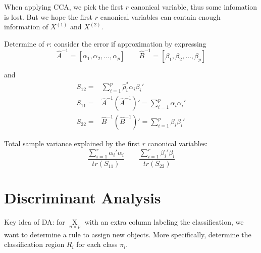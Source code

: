     When applying CCA, we pick the first $ r $ canonical variable, thus some infomation is lost. But we hope the first $ r $ canonical variables can contain enough information of $ X^{(1)} $ and $ X^{(2)} $.

    Determine of $ r $: consider the error if approximation by expressing
    \begin{equation}
        \hat{A}^{-1}=[\alpha _1,\alpha _2,\ldots,\alpha _p]\qquad \hat{B}^{-1}=[\beta _1,\beta _2,\ldots,\beta _p] 
    \end{equation}

    and 
    \begin{align}
        S_{12}=&\sum_{i=1}^p \hat{\rho }^*_i\alpha _i\beta _i'\\
        S_{11}=&\hat{A}^{-1}(\hat{A}^{-1})'=\sum_{i=1}^p\alpha _i\alpha _i'\\
        S_{22}=&\hat{B}^{-1}(\hat{B}^{-1})'=\sum_{i=1}^p\beta _i\beta _i'
    \end{align}
    
    Total sample variance explained by the first $ r $ canonical variables:
    \begin{equation}
        \dfrac{\sum_{i=1}^r\alpha _i'\alpha _i}{tr(S_{11})}\qquad \dfrac{\sum_{i=1}^r\beta _i'\beta _i}{tr(S_{22})} 
    \end{equation}
    
    



\section{Discriminant Analysis}\label{SubSectionDiscriminantAnalysis}
    Key idea of DA: for $ \mathop{X}\limits_{n\times p}  $ with an extra column labeling the classification, we want to determine a rule to assign new objects. More specifically, determine the classification region $ R_i $ for each class $ \pi_i $.

